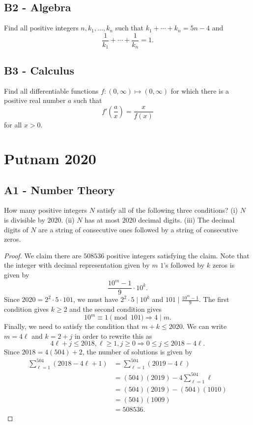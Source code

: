 \documentclass[11pt]{scrartcl}
\newcommand{\<}{\langle}
\renewcommand{\>}{\rangle}
\begin{document}
\subsection{B2 - Algebra}
Find all positive integers $n,k_1,\dots,k_n$ such that $k_1+\cdots+k_n=5n-4$ and
\[ \frac1{k_1}+\cdots+\frac1{k_n}=1. \]
\subsection{B3 - Calculus}
Find all differentiable functions $f: (0,\infty)\mapsto (0,\infty)$ for which there is a positive real number $a$ such that
\[ f'\left(\frac ax\right)=\frac x{f(x)} \]
for all $x>0.$


\pagebreak
\section{Putnam 2020}
\subsection{A1 - Number Theory}
How many positive integers $N$ satisfy all of the following three conditions?
(i) $N$ is divisible by $2020$.
(ii) $N$ has at most $2020$ decimal digits.
(iii) The decimal digits of $N$ are a string of consecutive ones followed by a string of consecutive zeros.
\begin{proof}
We claim there are $508536$ positive integers satisfying the claim.  Note that the integer with decimal representation given by $m$ $1$'s followed by $k$ zeros is given by 
$$\frac{10^m - 1}{9} \cdot 10^k.$$
Since $2020 = 2^2 \cdot 5 \cdot 101$, we must have $2^2 \cdot 5 \mid 10^k$ and $101 \mid \frac{10^m - 1}{9}.$  The first condition gives $k \ge 2$ and the second condition gives 
$$10^m \equiv 1 \pmod{101} \Rightarrow 4 \mid m.$$
Finally, we need to satisfy the condition that $m + k \le 2020$.  We can write $m = 4 \ell$ and $k = 2 + j$ in order to rewrite this as 
$$4\ell + j \le 2018, \ell \ge 1, j \ge 0 \Rightarrow 0 \le j \le 2018 - 4\ell.$$
Since $2018 = 4(504) + 2$, the number of solutions is given by 
\begin{align*}
\sum_{\ell = 1}^{504} (2018 - 4\ell + 1) &= \sum_{\ell = 1}^{504} (2019 - 4\ell) \\
&= (504)(2019) - 4 \sum_{\ell=1}^{504} \ell \\
&= (504)(2019) - (504)(1010) \\
&= (504)(1009) \\
&= 508536.
\end{align*}


\end{proof}
\end{document}
